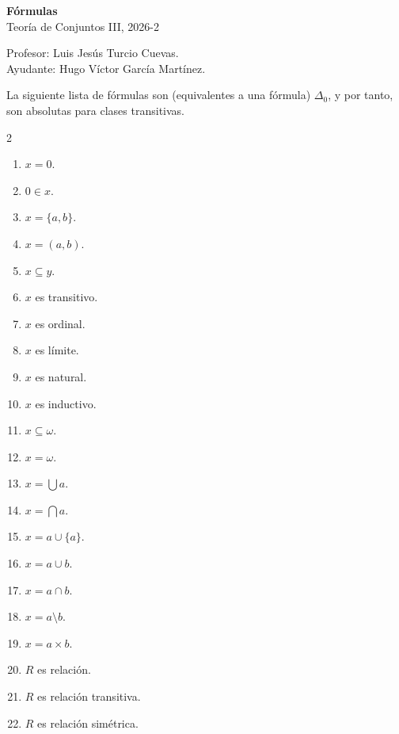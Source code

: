 \documentclass[letterpaper,DIV=15,12pt]{scrartcl}
\begin{document}
\thispagestyle{plain}

    \begin{center}
        {\fontsize{30}{60}\rmfamily \textbf{Fórmulas}} \\ \vspace{.2cm} Teoría de Conjuntos III, 2026-2
    \end{center}
    \begin{flushright}
        \footnotesize \hfill Profesor: Luis Jesús Turcio Cuevas.\\
        \hfill Ayudante: Hugo Víctor García Martínez.
    \end{flushright}
        
    La siguiente lista de fórmulas son (equivalentes a una fórmula) $\Delta_0$, y por tanto, son absolutas para clases transitivas.
    \begin{multicols}{2}
        \begin{enumerate}
            \item $x=0$.
            \item $0 \in x$.
            \item $x=\{a,b\}$.
            \item $x=(a,b)$.
            \item $x \subseteq y$.
            \item $x$ es transitivo.
            \item $x$ es ordinal.
            \item $x$ es límite.
            \item $x$ es natural.
            \item $x$ es inductivo.
            \item $x \subseteq \omega$.
            \item $x = \omega$.
            \item $x = \bigcup a$.
            \item $x = \bigcap a$.
            \item $x = a \cup \{a\}$.
            \item $x = a \cup b$.
            \item $x = a \cap b$.
            \item $x = a \setminus b$.
            \item $x = a \times b$.
            \item $R$ es relación.
            \item $R$ es relación transitiva.
            \item $R$ es relación simétrica.

\end{enumerate}
\end{multicols}
\end{document}
